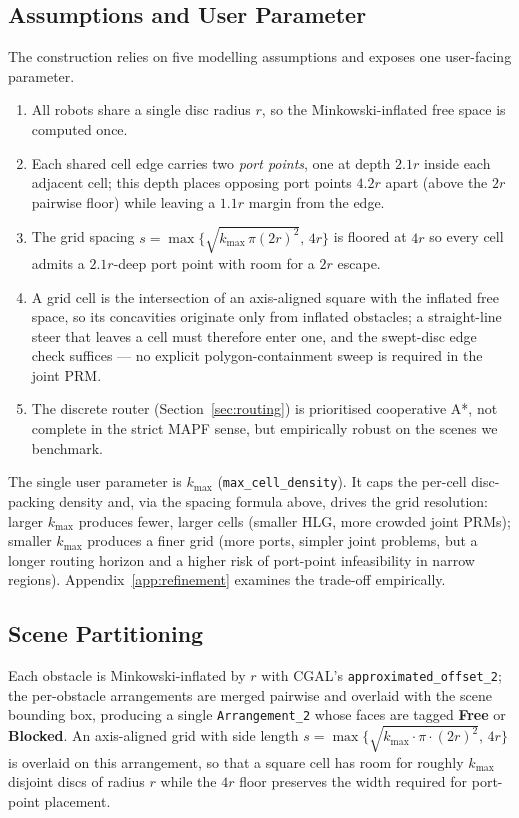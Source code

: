 \documentclass[12pt,a4paper]{article}
\begin{document}
    \subsection{Assumptions and User Parameter}
    \label{sec:assumptions}
    The construction relies on five modelling assumptions and exposes one user-facing parameter.
    \begin{enumerate}
        \item All robots share a single disc radius $r$, so the Minkowski-inflated free space is computed once.
        \item Each shared cell edge carries two \emph{port points}, one at depth $2.1r$ inside each adjacent cell; this depth places opposing port points $4.2r$ apart (above the $2r$ pairwise floor) while leaving a $1.1r$ margin from the edge.
        \item The grid spacing $s=\max\bigl\{\sqrt{k_{\max}\,\pi(2r)^2},\,4r\bigr\}$ is floored at $4r$ so every cell admits a $2.1r$-deep port point with room for a $2r$ escape.
        \item A grid cell is the intersection of an axis-aligned square with the inflated free space, so its concavities originate only from inflated obstacles; a straight-line steer that leaves a cell must therefore enter one, and the swept-disc edge check suffices --- no explicit polygon-containment sweep is required in the joint PRM.
        \item The discrete router (Section~\ref{sec:routing}) is prioritised cooperative A*, not complete in the strict MAPF sense, but empirically robust on the scenes we benchmark.
    \end{enumerate}
    The single user parameter is $k_{\max}$ (\texttt{max\_cell\_density}). It caps the per-cell disc-packing density and, via the spacing formula above, drives the grid resolution: larger $k_{\max}$ produces fewer, larger cells (smaller HLG, more crowded joint PRMs); smaller $k_{\max}$ produces a finer grid (more ports, simpler joint problems, but a longer routing horizon and a higher risk of port-point infeasibility in narrow regions). Appendix~\ref{app:refinement} examines the trade-off empirically.

    \subsection{Scene Partitioning}
    \label{sec:partition}
    Each obstacle is Minkowski-inflated by $r$ with CGAL's \texttt{approximated\_offset\_2}; the per-obstacle arrangements are merged pairwise and overlaid with the scene bounding box, producing a single \texttt{Arrangement\_2} whose faces are tagged \textbf{Free} or \textbf{Blocked}. An axis-aligned grid with side length $s = \max\bigl\{\sqrt{k_{\max}\cdot\pi\cdot(2r)^2},\,4r\bigr\}$ is overlaid on this arrangement, so that a square cell has room for roughly $k_{\max}$ disjoint discs of radius $r$ while the $4r$ floor preserves the width required for port-point placement.
\end{document}
